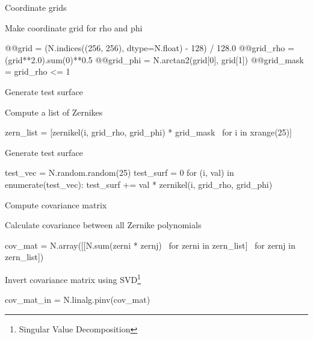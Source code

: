 \documentclass[xetex,10pt]{beamer}
\def\spacer{\vspace*{1em}}
\begin{document}
\begin{frame}[fragile]{Coordinate grids}

Make coordinate grid for rho and phi
\begin{python}
@@grid = (N.indices((256, 256), dtype=N.float) - 128) / 128.0
@@grid_rho = (grid**2.0).sum(0)**0.5
@@grid_phi = N.arctan2(grid[0], grid[1])
@@grid_mask = grid_rho <= 1
\end{python}
\end{frame}

\begin{frame}[fragile]{Generate test surface}

Compute a list of Zernikes

\begin{python}
zern_list = [zernikel(i, grid_rho, grid_phi) * grid_mask \
  for i in xrange(25)]
\end{python}

\spacer

Generate test surface

\begin{python}
test_vec = N.random.random(25)
test_surf = 0
for (i, val) in enumerate(test_vec):
  test_surf += val * zernikel(i, grid_rho, grid_phi)
\end{python}
\end{frame}

\begin{frame}[fragile]{Compute covariance matrix}

Calculate covariance between all Zernike polynomials

\begin{python}
cov_mat = N.array([[N.sum(zerni * zernj) \
  for zerni in zern_list] \
    for zernj in zern_list])
\end{python}

\spacer
Invert covariance matrix using SVD\footnote[frame]{Singular Value Decomposition}
\begin{python}
cov_mat_in = N.linalg.pinv(cov_mat)
\end{python}

\end{frame}
\end{document}
